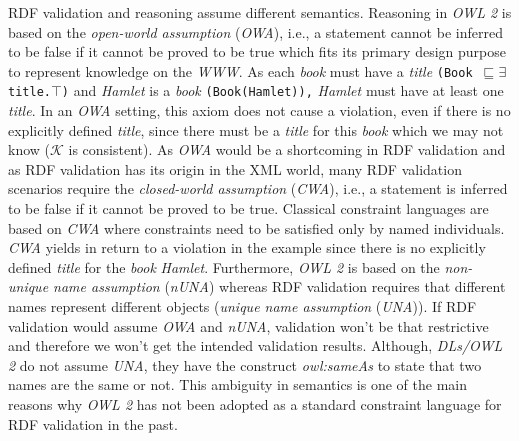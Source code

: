 \documentclass{acm_proc_article-sp}
\newcommand{\ms}[1]{%
  \texttt{#1}
}
\newcommand{\tb}[1]{\todo[size=\small, color=green!40]{\textbf{Thomas:} #1}}
\begin{document}
RDF validation and reasoning assume different semantics.
Reasoning in \emph{OWL 2} is based on the {\em open-world assumption} (\emph{OWA}), i.e., a statement cannot be inferred to be false if it cannot be proved to be true  which fits its primary design purpose to represent knowledge on the \emph{WWW}. 
As each \emph{book} must have a \emph{title} {\small\ms{(Book $\sqsubseteq \exists$ title.$\top$)}} and {\em Hamlet} is a \emph{book} {\small\ms{(Book(Hamlet)),}}
{\em Hamlet} must have at least one \emph{title}.
In an \emph{OWA} setting, this axiom does not cause a violation, even if there is no explicitly defined \emph{title}, since there must be a \emph{title} for this \emph{book} which we may not know ($\mathcal{K}$ is consistent).
As \emph{OWA} would be a shortcoming in RDF validation and
as RDF validation has its origin in the XML world, 
many RDF validation scenarios require the {\em closed-world assumption} (\emph{CWA}), i.e., a statement is inferred to be false if it cannot be proved to be true.
Classical constraint languages are based on \emph{CWA} where constraints need to be satisfied only by named individuals. 
\emph{CWA} yields in return to a violation in the example since there is no explicitly defined \emph{title} for the \emph{book} {\em Hamlet}. 
Furthermore, \emph{OWL 2} is based on the {\em non-unique name assumption} (\emph{nUNA}) whereas RDF validation requires that different names represent different objects ({\em unique name assumption} (\emph{UNA})). 
If RDF validation would assume \emph{OWA} and \emph{nUNA}, validation won’t be that restrictive and therefore we won’t get the intended validation results.
Although, \emph{DLs/OWL 2} do not assume \emph{UNA}, they have the construct \emph{owl:sameAs} to state that two names are the same or not.
This ambiguity in semantics is one of the main reasons why \emph{OWL 2} has not been adopted as a standard constraint language for RDF validation in the past.
\end{document}
